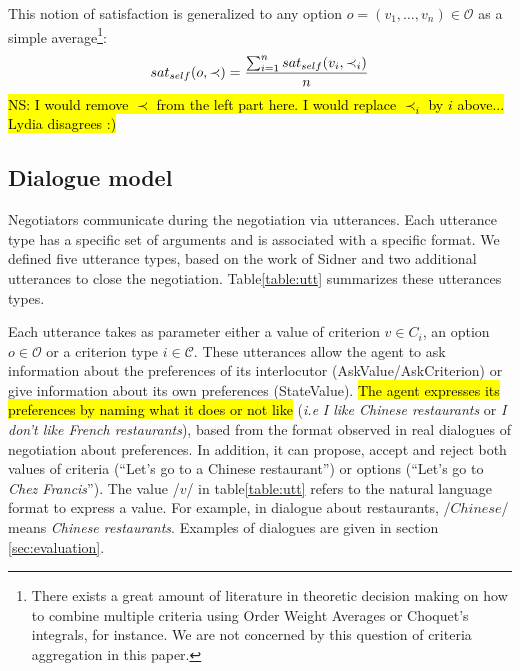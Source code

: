 \documentclass{llncs}
\begin{document}
		This notion of satisfaction is generalized to any option $o= (v_1, \ldots, v_n)\in \mathcal{O}$ as a simple average\footnote{There exists a great amount of literature in theoretic decision making on how to combine multiple criteria using Order Weight Averages or Choquet's integrals, for instance. We are not concerned by this question of criteria aggregation in this paper.}:
		\vspace{-1em} 
		\begin{equation}
		sat_{self}(o, \prec) = \frac{\sum_{i=1}^{n} sat_{self}(v_i, \prec_i) }{n}
		\vspace{-1.5em} 
		\end{equation}
		\hl{NS: I would remove $\prec$ from the left part here. I would replace $\prec_i$ by $i$ above... Lydia disagrees :)}
		
		\subsection{Dialogue model}
		Negotiators communicate during the negotiation via utterances. Each utterance type has a specific set of arguments and is associated with a specific format. We defined five utterance types, based on the work of Sidner \cite{sidner1994artificial} and two additional utterances to close the negotiation. Table\ref{table:utt} summarizes these utterances types. 

		Each utterance takes as parameter either a value of criterion $v \in C_i$, an option $o \in \mathcal{O}$ or a criterion type $i \in \mathcal{C}$. These utterances allow the agent to ask information about the preferences of its interlocutor (AskValue/AskCriterion) or give information about its own preferences (StateValue). \hl{The agent expresses its preferences by naming what it does or not like }(\emph{i.e} \textit{I like Chinese restaurants} or \textit{I don't like French restaurants}), based from the format observed in real dialogues of negotiation about preferences.
		In addition, it can propose, accept and reject both values of criteria (``Let's go to a Chinese restaurant'') or options (``Let's go to \emph{Chez Francis}''). The value /$v$/ in table\ref{table:utt} refers to the natural language format to express a value. For example, in dialogue about restaurants, /$Chinese$/ means \textit{Chinese restaurants}. 
		Examples of dialogues are given in section \ref{sec:evaluation}.
		
\end{document}

